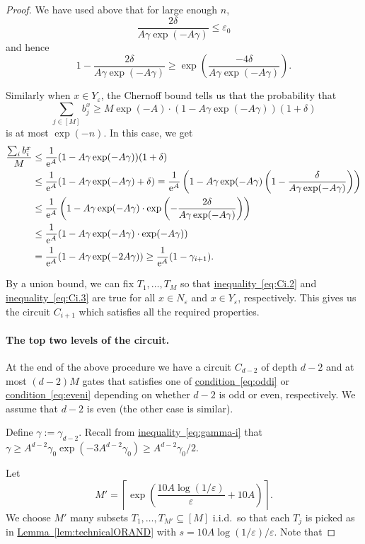 \documentclass[11pt]{article}
\numberwithin{equation}{section}
\theoremstyle{definition}
\theoremstyle{plain}
\newcommand{\eee}{\mathrm e}
\newcommand{\expref}[2]{\hyperref[#2]{#1~\ref{#2}}}
\newcommand{\expeqref}[2]{\hyperref[#2]{#1~\eqref{#2}}}
\begin{document}
\begin{proof}
We have used above that for large enough $n$,
\[
  \frac{2\delta}{A\gamma\exp(-A\gamma)}\leq \varepsilon_0
\]
and hence
\[
  1-\frac{2\delta}{A\gamma\exp(-A\gamma)}\geq \exp\left(\frac{-4\delta}{A\gamma\exp(-A\gamma)}\right).
\]

Similarly when $x\in Y_\varepsilon$, the Chernoff bound tells us that the probability that
\[
  \sum_{j\in [M]}b_j^x\geq M\exp(-A)\cdot (1-A\gamma\exp(-A\gamma))(1+\delta)
\]
is at most $\exp(-n)$. In this case, we get
\begin{align}
\frac{\sum_i b_i^x}{M}&\leq \frac{1}{\eee^A}(1-A\gamma\exp(-A\gamma))(1+\delta)\notag\\
&\leq \frac{1}{\eee^A}(1-A\gamma\exp(-A\gamma) +\delta) = \frac{1}{\eee^A}\left(1-A\gamma\exp(-A\gamma)\left(1-\frac{\delta}{A\gamma\exp(-A\gamma)}\right)\right)\notag\\
&\leq \frac{1}{\eee^A}\left(1-A\gamma\exp(-A\gamma)\cdot\exp\left(-\frac{2\delta}{A\gamma\exp(-A\gamma)}\right)\right)\notag\\
&\leq \frac{1}{\eee^A}(1-A\gamma\exp(-A\gamma)\cdot \exp(-A\gamma))\notag\\
&= \frac{1}{\eee^A}(1-A\gamma\exp(-2A\gamma))\geq \frac{1}{\eee^A}(1-\gamma_{i+1}).\label{eq:Ci.3}
\end{align}

By a union bound, we can fix $T_1,\ldots,T_M$ so that \expeqref{inequality}{eq:Ci.2} and \expeqref{inequality}{eq:Ci.3} are true for all $x\in N_\varepsilon$ and $x\in Y_\varepsilon$, %
respectively. This gives us the circuit $C_{i+1}$ which satisfies all the required properties.

\paragraph{The top two levels of the circuit.} At the end of the above procedure we have a circuit $C_{d-2}$ of depth $d-2$ and at most $(d-2)M$ gates that satisfies one of \expeqref{condition}{eq:oddi} or \expeqref{condition}{eq:eveni} depending on whether $d-2$ is odd or even,  %
respectively. We assume that $d-2$ is even (the other case is similar). 

Define $\gamma := \gamma_{d-2}$. Recall from \expeqref{inequality}{eq:gamma-i} that $\gamma \geq A^{d-2}\gamma_0\exp(-3A^{d-2}\gamma_0)\geq A^{d-2}\gamma_0/2$.

Let
\[
  M' = \left\lceil \exp\left(\frac{10A\log(1/\varepsilon)}{\varepsilon}+10A\right)\right\rceil.
\]
We choose $M'$ many subsets $T_1,\ldots,T_{M'}\subseteq [M]$ i.i.d.\
so that each $T_j$ is picked as in \expref{Lemma}{lem:technicalORAND}
with $s = 10A\log(1/\varepsilon)/\varepsilon$. Note that


\end{proof}
\end{document}
